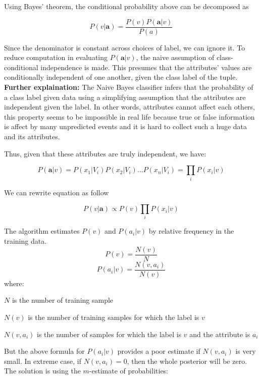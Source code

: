 \documentclass[a4paper]{article}
\renewcommand{\vec}[1]{\mathbf{#1}}
\begin{document}
		Using Bayes' theorem, the conditional probability above can be
		decomposed as

		\[P(v | \vec{a}) = \frac{P(v) P(\vec{a} | v)}{P(a)}\]

		Since the denominator is constant across choices of label, we
		can ignore it.	To reduce computation in evaluating $P(\vec{a}
		| v)$, the naive assumption of class-conditional independence is
		made. This presumes that the attributes' values are conditionally
		independent of one another, given the class label of the tuple.\\
		\textbf{Further explaination:} The Naive Bayes classifier
		infers that the probability of a class label given data using a
		simplifying assumption that the attributes are independent given
		the label. In other words, attributes cannot affect each others,
		this property seems to be impossible in real life because true or
		false information is affect by many unpredicted events and it is
		hard to collect such a huge data and its attributes.
 
		Thus, given that these attributes are truly independent, we have:

		\begin{equation}
			\label{eq:product}
			P(\vec{a} | v) = P(x_1 | V_i) P(x_2 | V_i) \ldots P(x_n | V_i)
			               = \prod_i{P(x_i | v)}
		\end{equation}

		We can rewrite equation as follow

		\[P(v | \vec{a}) \propto P(v) \prod_i{P(x_i | v)}\]

		The algorithm estimates $P(v)$ and $P(a_i | v)$ by relative
		frequency in the training data.
		\[P(v) = \frac{N(v)}{N}\]
		\[P(a_i | v) = \frac{N(v, a_i)}{N(v)}\]
		where:
		\begin{description}
			\item $N$ is the number of training sample
			\item $N(v)$ is the number of training samples for which
				the label is $v$
			\item $N(v, a_i)$ is the number of samples for which the
				label is $v$ and the attribute is $a_i$
		\end{description}

		But the above formula for $P(a_i | v)$ provides a poor estimate
		if $N(v,a_i)$ is very small. In extreme case, if $N(v,a_i)=0$,
		then the whole posterior will be zero. The solution is using the
		$m$-estimate of probabilities:
\end{document}
